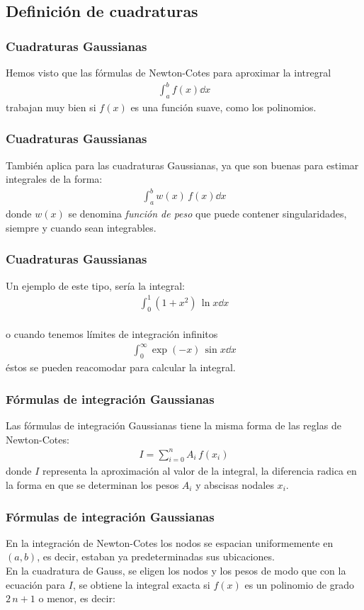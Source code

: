 \subsection{Definición de cuadraturas}
\begin{frame}
\frametitle{Cuadraturas Gaussianas}
Hemos visto que las fórmulas de Newton-Cotes para aproximar la intregral
\begin{align*}
\int_{a}^{b} f(x) \dd{x}
\end{align*}
trabajan muy bien si $f(x)$ es una función suave, como los polinomios.
\end{frame}
\begin{frame}
\frametitle{Cuadraturas Gaussianas}
También aplica para las cuadraturas Gaussianas, ya que son buenas para estimar integrales de la forma:
\begin{align*}
\int_{a}^{b} w(x) \, f(x) \dd{x}
\end{align*}
donde $w(x)$ se denomina \emph{función de peso} que puede contener singularidades, siempre y cuando sean integrables.
\end{frame}
\begin{frame}
\frametitle{Cuadraturas Gaussianas}
Un ejemplo de este tipo, sería la integral:
\begin{align*}
\int_{0}^{1} \left(1 + x^{2} \right) \, \ln x  \dd{x}
\end{align*}
\\
\bigskip
\pause
o cuando tenemos límites de integración infinitos
\begin{align*}
\int_{0}^{\infty} \exp(-x) \, \sin x \dd{x}
\end{align*}
éstos se pueden reacomodar para calcular la integral.
\end{frame}
\begin{frame}
\frametitle{Fórmulas de integración Gaussianas}
Las fórmulas de integración Gaussianas tiene la misma forma de las reglas de Newton-Cotes:
\begin{align*}
I = \sum_{i=0}^{n} A_{i} \, f(x_{i})
\end{align*}
donde $I$ representa la aproximación al valor de la integral, la diferencia radica en la forma en que se determinan los pesos $A_{i}$ y abscisas nodales $x_{i}$.
\end{frame}
\begin{frame}
\frametitle{Fórmulas de integración Gaussianas}
En la integración de Newton-Cotes los nodos se espacian uniformemente en $(a, b)$, es decir, estaban ya predeterminadas sus ubicaciones.
\\
\bigskip
En la cuadratura de Gauss, se eligen los nodos y los pesos de modo que con la ecuación para $I$, se obtiene la integral exacta si $f(x)$ es un polinomio de grado $2 \, n + 1$ o menor, es decir:
\end{frame}
